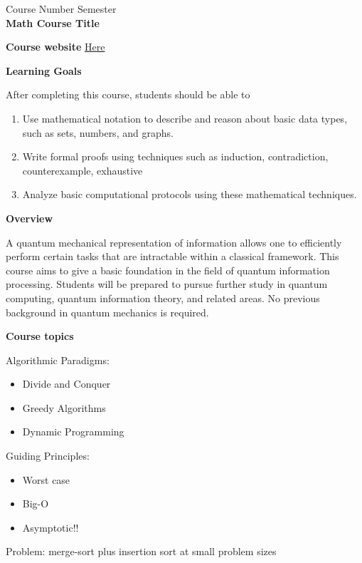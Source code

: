 \documentclass[11pt]{article}
\begin{document}

{\Large {Course Number} \hfill Semester} \\[3pt]
{\Large {\bf Math Course Title}}

\bigskip

{\bf Course website} \url{Here}

\medskip

{\bf Learning Goals}

After completing this course, students should be able to
\begin{enumerate}
\item Use mathematical notation to describe and reason about basic data types, such as sets, numbers, and graphs.
\item Write formal proofs using techniques such as induction, contradiction, counterexample, exhaustive
\item Analyze basic computational protocols using these mathematical techniques.
\end{enumerate}

{\bf Overview}

A quantum mechanical representation of information allows one to efficiently perform certain tasks that are intractable within a classical framework.  This course aims to give a basic foundation in the field of quantum information processing.  Students will be prepared to pursue further study in quantum computing, quantum information theory, and related areas.  No previous background in quantum mechanics is required.

\medskip

{\bf Course topics}

Algorithmic Paradigms:
\begin{itemize}
\item Divide and Conquer
\item Greedy Algorithms
\item Dynamic Programming
\end{itemize}

Guiding Principles:
\begin{itemize}
\item Worst case
\item Big-O
\item Asymptotic!!
\end{itemize}


Problem: merge-sort plus insertion sort at small problem sizes
\end{document}
